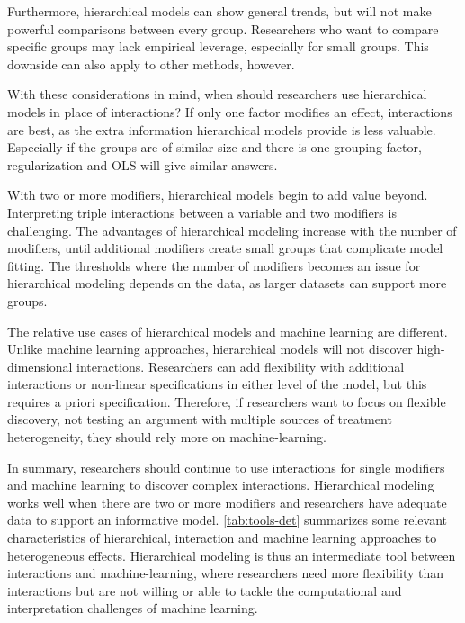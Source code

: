 \documentclass[12pt]{article}
\begin{document}
Furthermore, hierarchical models can show general trends, but will not make powerful comparisons between every group. 
Researchers who want to compare specific groups may lack empirical leverage, especially for small groups.
This downside can also apply to other methods, however. 


With these considerations in mind, when should researchers use hierarchical models in place of interactions?
If only one factor modifies an effect, interactions are best, as the extra information hierarchical models provide is less valuable. 
Especially if the groups are of similar size and there is one grouping factor, regularization and OLS will give similar answers.


With two or more modifiers, hierarchical models begin to add value beyond. 
Interpreting triple interactions between a variable and two modifiers is challenging. 
The advantages of hierarchical modeling increase with the number of modifiers, until additional modifiers create small groups that complicate model fitting. 
The thresholds where the number of modifiers becomes an issue for hierarchical modeling depends on the data, as larger datasets can support more groups. 


The relative use cases of hierarchical models and machine learning are different. 
Unlike machine learning approaches, hierarchical models will not discover high-dimensional interactions. 
Researchers can add flexibility with additional interactions or non-linear specifications in either level of the model, but this requires a priori specification. 
Therefore, if researchers want to focus on flexible discovery, not testing an argument with multiple sources of treatment heterogeneity, they should rely more on machine-learning. 


In summary, researchers should continue to use interactions for single modifiers and machine learning to discover complex interactions. 
Hierarchical modeling works well when there are two or more modifiers and researchers have adequate data to support an informative model.  
\autoref{tab:tools-det} summarizes some relevant characteristics of hierarchical, interaction and machine learning approaches to heterogeneous effects. 
Hierarchical modeling is thus an intermediate tool between interactions and machine-learning, where researchers need more flexibility than interactions but are not willing or able to tackle the computational and interpretation challenges of machine learning. 
\end{document}
